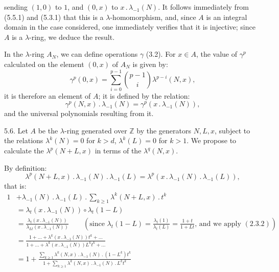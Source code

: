 %
sending \((1,0)\) to \(1\), and \((0,x)\) to \(x\mathbin{.}\lambda_{-1}(N)\). It follows immediately from (5.5.1) and (5.3.1) that this is a \(\lambda\)-homomorphism, and, since \(A\) is an integral domain in the case considered, one immediately verifies that it is injective; since \(A\) is a \(\lambda\)-ring, we deduce the result.

In the \(\lambda\)-ring \(A_N\), we can define operations \(\gamma\) (3.2). For \(x\in A\), the value of \(\gamma^p\) calculated on the element \((0,x)\) of \(A_N\) is given by:
\[
  \gamma^p(0,x)=\sum_{i=0}^{p-1}\binom{p-1}{i}\lambda^{p-i}(N,x),
\]
it is therefore an element of \(A\); it is defined by the relation:
\begin{equation}\tag{5.5.4}
  \gamma^p(N,x)\mathbin{.}\lambda_{-1}(N)=\gamma^p(x\mathbin{.}\lambda_{-1}(N)),
\end{equation}
and the universal polynomials resulting from it.

5.6. Let \(A\) be the \(\lambda\)-ring generated over \(\mathbb Z\) by the generators \(N,L,x\), subject to the relations \(\lambda^k(N)=0\) for \(k>d\), \(\lambda^k(L)=0\) for \(k>1\). We propose to calculate the \(\lambda^p(N+L,x)\) in terms of the \(\lambda^q(N,x)\).

By definition:
\[
  \lambda^p(N+L,x)\mathbin{.}\lambda_{-1}(N)\mathbin{.}\lambda_{-1}(L)
  =\lambda^p(x\mathbin{.}\lambda_{-1}(N)\mathbin{.}\lambda_{-1}(L)),
\]
that is:
\[
\begin{aligned}
1&+\lambda_{-1}(N)\mathbin{.}\lambda_{-1}(L)\mathbin{.}\sum_{k\ge1}\lambda^k(N+L,x)\mathbin{.} t^k \\
 &=\lambda_t(x\mathbin{.}\lambda_{-1}(N))\circ \lambda_t(1-L) \\
 &=\frac{\lambda_t(x\mathbin{.}\lambda_{-1}(N))}{\lambda_{Lt}(x\mathbin{.}\lambda_{-1}(N))}
   \qquad\left(\text{since }\lambda_t(1-L)=\frac{\lambda_t(1)}{\lambda_t(L)}=\frac{1+t}{1+Lt}\text{, and we apply }(2.3.2)\right) \\
 &=\frac{1+\ldots+\lambda^k(x\mathbin{.}\lambda_{-1}(N))t^k+\ldots}{1+\ldots+\lambda^k(x\mathbin{.}\lambda_{-1}(N))L^k t^k+\ldots} \\
 &=1+\frac{\sum_{k\ge1}\lambda^k(N,x)\mathbin{.}\lambda_{-1}(N)\mathbin{.}(1-L^k)t^k}{1+\sum_{k\ge1}\lambda^k(N,x)\mathbin{.}\lambda_{-1}(N)\mathbin{.} L^k t^k}
\end{aligned}
\]

